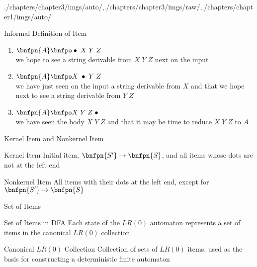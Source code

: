 \begin{graphicspathcontext}{{./chapters/chapter3/imgs/auto/},{./chapters/chapter3/imgs/raw/},{./chapters/chapter1/imgs/auto/}}
\begin{bibunit}[apalike]
\begin{frame}{{Informal Definition} of Item}
	\vspace{1cm}
	\begin{examples}
		\begin{enumerate}
			\item $\bnfpn{A} \bnfpo \bnfindex \; X \; Y \; Z$ \\
				we hope to see a string derivable from $X \; Y \; Z$ next on the input
			\item $\bnfpn{A} \bnfpo X \; \bnfindex \; Y \; Z$ \\
				we have just seen on the input a string derivable from $X$ and that we hope next to see a string derivable from $Y \; Z$
			\item $\bnfpn{A} \bnfpo X \; Y \; Z \; \bnfindex$ \\
				we have seen the body $X \; Y \; Z$ and that it may be time to reduce $X \; Y \; Z$ to $A$
		\end{enumerate}
	\end{examples}
\end{frame}

\begin{frame}{{Kernel Item} and Nonkernel Item}
	\begin{definitionblock}{Kernel Item}
		Initial item, $\bnfpn{S'} \bnfopo \bnfpn{S}$, and all items whose dots are not at the left end
	\end{definitionblock}
	\vspace{1cm}
	\begin{definitionblock}{Nonkernel Item}
		All items with their dots at the left end, except for $\bnfpn{S'} \bnfopo \bnfpn{S}$
	\end{definitionblock}
\end{frame}

\begin{frame}{Set of Items}
	\begin{definitionblock}{Set of Items in DFA}
		Each state of the $LR(0)$ automaton represents a set of items in the canonical $LR(0)$ collection
	\end{definitionblock}
	\vspace{.5cm}
	\begin{definitionblock}{Canonical $LR(0)$ Collection}
		Collection of sets of $LR(0)$ items, used as the basis for constructing a deterministic finite automaton
	\end{definitionblock}
	\vspace{.5cm}
\end{frame}


\end{bibunit}
\end{graphicspathcontext}
